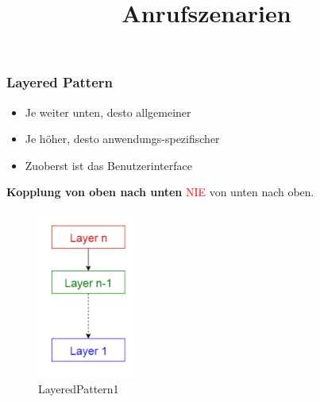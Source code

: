 \documentclass[../ZF_SWEN1.tex]{subfiles}
\begin{document}
\subsubsection{Layered Pattern}
\begin{multicols}{2}
\begin{itemize}
	\item Je weiter unten, desto allgemeiner
	\item Je höher, desto anwendungs-spezifischer
	\item Zuoberst ist das Benutzerinterface
\end{itemize}

\textbf{Kopplung von oben nach unten} \textcolor {red} {NIE} von unten nach oben.

\columnbreak

\begin{figure}[H]			\includegraphics[width=0.3\textwidth] {Resources/Images/LayeredPattern1.png}
\caption{\label{fig:LayeredPattern1}LayeredPattern1}
\end{figure}

\end{multicols}

\pagebreak

\title{Anrufszenarien}
\end{document}
